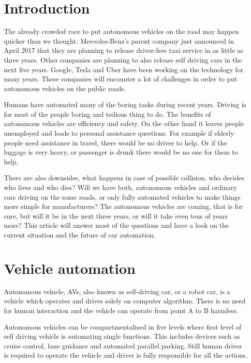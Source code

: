 \documentclass[english]{tktltiki}
\begin{document}
\mytableofcontents

\section{Introduction}
The already crowded race to put autonomous vehicles on the road may happen 
quicker than we thought. Mercedes-Benz's parent company just announced in April 
2017 that they are planning to release driver-free taxi service in as little as 
three years. Other companies are planning to also release self 
driving cars in the next five years. Google, Tesla and Uber have been working on 
the technology for many years. These companies will encounter a lot of 
challenges in order to put autonomous vehicles on the public roads. 

Humans have automated many of the boring tasks during recent years. Driving is 
for most of the people boring and tedious thing to do. The benefits of 
autonomous vehicles are efficiency and safety. On the other hand it leaves 
people unemployed and leads to personal assistance questions. For example if 
elderly people need assistance in travel, there would be no driver to help. Or 
if the luggage is very heavy, or passenger is drunk there would be no one for 
them to help. 

There are also downsides, what happens in case of possible collision, who 
decides who lives and who dies? Will we have both, autonomous vehicles and 
ordinary cars driving on the some roads, or only fully automated vehicles to 
make things more simple for manufacturers? The autonomous vehicles are coming, 
that is for sure, but will it be in the next three years, or will it take even 
tens of years more? This article will answer most of the questions and have a 
look on the current situation and the future of car automation.

\section{Vehicle automation}
Autonomous vehicle, AVs, also known as self-driving car, or a robot car, is a 
vehicle which operates and drives solely on computer algorithm. There is no need 
for human interaction and the vehicle can operate from point A to B harmless. 

Autonomous vehicles can be compartmentalized in five levels \cite{transportpolicy} where first level of self 
driving vehicle is automating single functions. This includes devices such as 
cruise control, lane guidance and automated parallel parking. 
Still human driver is required to operate the vehicle and 
driver is fully responsible for all the actions.
\end{document}
